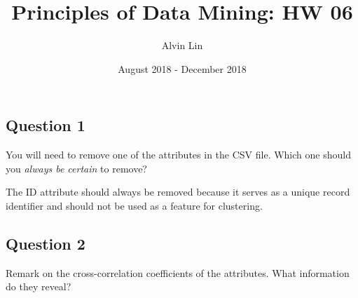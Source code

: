 \documentclass{math}
\title{Principles of Data Mining: HW 06}
\author{Alvin Lin}
\date{August 2018 - December 2018}
\begin{document}
\maketitle

\subsection*{Question 1}
You will need to remove one of the attributes in the CSV file. Which one should
you \textit{always be certain} to remove? \par
The ID attribute should always be removed because it serves as a unique record
identifier and should not be used as a feature for clustering.

\subsection*{Question 2}
Remark on the cross-correlation coefficients of the attributes. What information
do they reveal? \par
\end{document}
